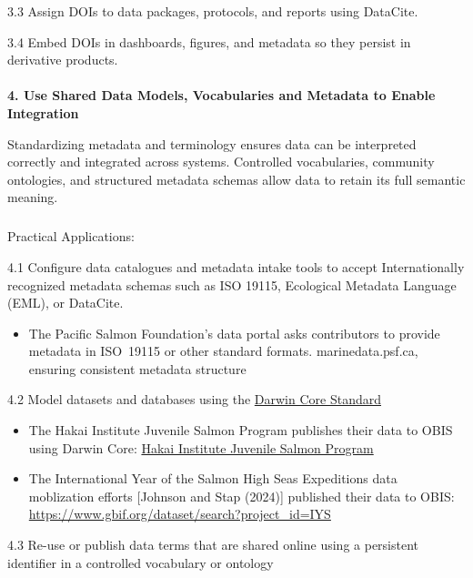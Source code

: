 \documentclass[
  letterpaper,
  DIV=11,
  numbers=noendperiod]{scrartcl}
\makeatletter
\let\oldparagraph\paragraph
\renewcommand{\paragraph}{
    \@ifstar
      \xxxParagraphStar
      \xxxParagraphNoStar
  }
\newcommand{\xxxParagraphStar}[1]{\oldparagraph*{#1}\mbox{}}
\newcommand{\xxxParagraphNoStar}[1]{\oldparagraph{#1}\mbox{}}
\let\oldsubparagraph\subparagraph
\renewcommand{\subparagraph}{
    \@ifstar
      \xxxSubParagraphStar
      \xxxSubParagraphNoStar
  }
\newcommand{\xxxSubParagraphStar}[1]{\oldsubparagraph*{#1}\mbox{}}
\newcommand{\xxxSubParagraphNoStar}[1]{\oldsubparagraph{#1}\mbox{}}
\providecommand{\tightlist}{%
  \setlength{\itemsep}{0pt}\setlength{\parskip}{0pt}}\usepackage{longtable,booktabs,array}
\makeatother
\begin{document}
3.3 Assign DOIs to data packages, protocols, and reports using DataCite.

3.4 Embed DOIs in dashboards, figures, and metadata so they persist in
derivative products.

\paragraph{\texorpdfstring{\textbf{4. Use Shared Data Models,
Vocabularies and Metadata to Enable
Integration}}{4. Use Shared Data Models, Vocabularies and Metadata to Enable Integration}}\label{use-shared-data-models-vocabularies-and-metadata-to-enable-integration}

Standardizing metadata and terminology ensures data can be interpreted
correctly and integrated across systems. Controlled vocabularies,
community ontologies, and structured metadata schemas allow data to
retain its full semantic meaning.

\subparagraph{Practical Applications:}\label{practical-applications-3}

4.1 Configure data catalogues and metadata intake tools to accept
Internationally recognized metadata schemas such as ISO 19115,
Ecological Metadata Language (EML), or DataCite.

\begin{itemize}
\tightlist
\item
  The Pacific Salmon Foundation's data portal asks contributors to
  provide metadata in ISO~19115 or other standard formats.
  marinedata.psf.ca, ensuring consistent metadata structure
\end{itemize}

4.2 Model datasets and databases using the
\href{https://dwc.tdwg.org/}{Darwin Core Standard}

\begin{itemize}
\item
  The Hakai Institute Juvenile Salmon Program publishes their data to
  OBIS using Darwin Core:
  \href{https://www.gbif.org/dataset/72de3af4-1572-4f2d-8006-2bfa2007065c}{Hakai
  Institute Juvenile Salmon Program}
\item
  The International Year of the Salmon High Seas Expeditions data
  moblization efforts {[}Johnson and Stap (2024){]} published their data
  to OBIS: \url{https://www.gbif.org/dataset/search?project_id=IYS}
\end{itemize}

4.3 Re-use or publish data terms that are shared online using a
persistent identifier in a controlled vocabulary or ontology
\end{document}
